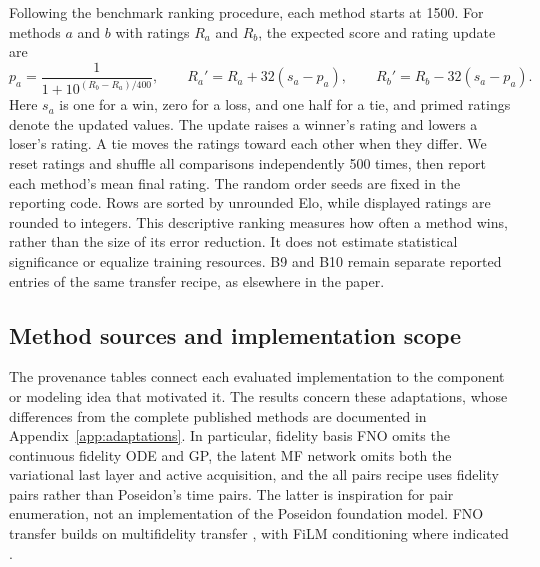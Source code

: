 Following the benchmark ranking procedure, each method starts at 1500.
For methods $a$ and $b$ with ratings $R_a$ and $R_b$, the expected score and
rating update are
\begin{equation}
 p_a=\frac{1}{1+10^{(R_b-R_a)/400}},\qquad
 R_a'=R_a+32(s_a-p_a),\qquad R_b'=R_b-32(s_a-p_a).
\end{equation}
Here $s_a$ is one for a win, zero for a loss, and one half for a tie, and
primed ratings denote the updated values.
The update raises a winner's rating and lowers a loser's rating. A tie moves
the ratings toward each other when they differ.
We reset ratings and shuffle all comparisons independently 500 times, then
report each method's mean final rating. The random order seeds are fixed in
the reporting code. Rows are sorted by unrounded Elo, while displayed ratings
are rounded to integers. This descriptive ranking measures how often a method
wins, rather than the size of its error reduction. It does not estimate
statistical significance or equalize training resources. B9 and B10 remain
separate reported entries of the same transfer recipe, as elsewhere in the paper.

\subsection{Method sources and implementation scope}
The provenance tables connect each evaluated implementation to the component
or modeling idea that motivated it. The results concern these adaptations,
whose differences from the complete published methods are documented in
Appendix~\ref{app:adaptations}. In particular, fidelity basis FNO omits the
continuous fidelity ODE and GP, the latent MF network omits both the variational
last layer and active acquisition, and the all pairs recipe uses fidelity pairs
rather than Poseidon's time pairs.
The latter is inspiration for pair enumeration, not an implementation of the
Poseidon foundation model. FNO transfer builds on multifidelity transfer
\citep{lyu2023}, with FiLM conditioning where indicated \citep{perez2018}.

\begin{table}[t]
\centering\footnotesize\setlength{\tabcolsep}{3pt}
\caption{Sources and adaptations for the nine ensemble members.}
\label{tab:portfolio}
\end{table}
\begin{table}[t]
\centering\footnotesize\setlength{\tabcolsep}{3pt}
\caption{Sources and adaptations for the additional reference implementations.}

\end{table}
\begin{table}[t]
\centering\footnotesize\setlength{\tabcolsep}{3pt}
\caption{Transfer variants and classical controls.}

\end{table}


